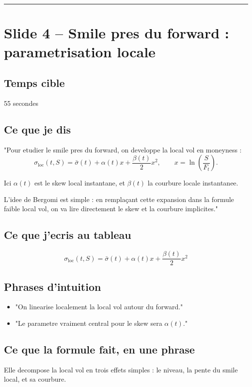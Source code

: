 \documentclass[11pt,a4paper]{article}
\begin{document}
\bigskip\hrule\bigskip

\section{Slide 4 -- Smile pres du forward : parametrisation locale}

\subsection{Temps cible}
55 secondes

\subsection{Ce que je dis}

"Pour etudier le smile pres du forward, on developpe la local vol en moneyness :
\[
\sigma_{\mathrm{loc}}(t,S)=\bar{\sigma}(t)+\alpha(t)x+\frac{\beta(t)}{2}x^2,
\qquad
x=\ln\!\left(\frac{S}{F_t}\right).
\]

Ici \(\alpha(t)\) est le skew local instantane, et \(\beta(t)\) la courbure locale instantanee.

L'idee de Bergomi est simple : en remplaçant cette expansion dans la formule faible local vol, on va lire directement le skew et la courbure implicites."

\subsection{Ce que j'ecris au tableau}

\[
\sigma_{\mathrm{loc}}(t,S)=\bar{\sigma}(t)+\alpha(t)x+\frac{\beta(t)}{2}x^2
\]

\subsection{Phrases d'intuition}

\begin{itemize}
\item "On linearise localement la local vol autour du forward."
\item "Le parametre vraiment central pour le skew sera \(\alpha(t)\)."
\end{itemize}

\subsection{Ce que la formule fait, en une phrase}

Elle decompose la local vol en trois effets simples : le niveau, la pente du smile local, et sa courbure.
\end{document}
